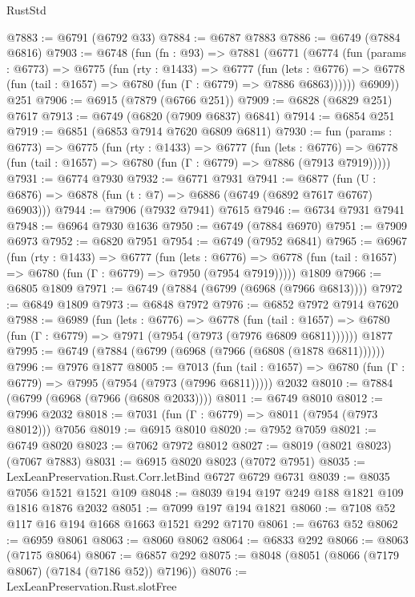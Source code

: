 \begin{lexlean}{RustStd}
\begin{coremodule}
@7883 := @6791 (@6792 @33)
@7884 := @6787 @7883
@7886 := @6749 (@7884 @6816)
@7903 := @6748
    (fun (fn : @93) =>
    @7881
      (@6771
        (@6774
          (fun (params : @6773) =>
          @6775
            (fun (rty : @1433) =>
            @6777
              (fun (lets : @6776) =>
              @6778 (fun (tail : @1657) => @6780 (fun (Γ : @6779) => @7886 @6863))))))
        @6909))
    @251
@7906 := @6915 (@7879 (@6766 @251))
@7909 := @6828 (@6829 @251) @7617
@7913 := @6749 (@6820 (@7909 @6837) @6841)
@7914 := @6854 @251
@7919 := @6851 (@6853 @7914 @7620 @6809 @6811)
@7930 := fun (params : @6773) =>
  @6775
    (fun (rty : @1433) =>
    @6777
      (fun (lets : @6776) =>
      @6778 (fun (tail : @1657) => @6780 (fun (Γ : @6779) => @7886 (@7913 @7919)))))
@7931 := @6774 @7930
@7932 := @6771 @7931
@7941 := @6877 (fun (U : @6876) => @6878 (fun (t : @7) => @6886 (@6749 (@6892 @7617 @6767) @6903)))
@7944 := @7906 (@7932 @7941) @7615
@7946 := @6734 @7931 @7941
@7948 := @6964 @7930 @1636
@7950 := @6749 (@7884 @6970)
@7951 := @7909 @6973
@7952 := @6820 @7951
@7954 := @6749 (@7952 @6841)
@7965 := @6967
    (fun (rty : @1433) =>
    @6777
      (fun (lets : @6776) =>
      @6778 (fun (tail : @1657) => @6780 (fun (Γ : @6779) => @7950 (@7954 @7919)))))
    @1809
@7966 := @6805 @1809
@7971 := @6749 (@7884 (@6799 (@6968 (@7966 @6813))))
@7972 := @6849 @1809
@7973 := @6848 @7972
@7976 := @6852 @7972 @7914 @7620
@7988 := @6989
    (fun (lets : @6776) =>
    @6778
      (fun (tail : @1657) => @6780 (fun (Γ : @6779) => @7971 (@7954 (@7973 (@7976 @6809 @6811))))))
    @1877
@7995 := @6749 (@7884 (@6799 (@6968 (@7966 (@6808 (@1878 @6811))))))
@7996 := @7976 @1877
@8005 := @7013
    (fun (tail : @1657) => @6780 (fun (Γ : @6779) => @7995 (@7954 (@7973 (@7996 @6811)))))
    @2032
@8010 := @7884 (@6799 (@6968 (@7966 (@6808 @2033))))
@8011 := @6749 @8010
@8012 := @7996 @2032
@8018 := @7031 (fun (Γ : @6779) => @8011 (@7954 (@7973 @8012))) @7056
@8019 := @6915 @8010
@8020 := @7952 @7059
@8021 := @6749 @8020
@8023 := @7062 @7972 @8012
@8027 := @8019 (@8021 @8023) (@7067 @7883)
@8031 := @6915 @8020 @8023 (@7072 @7951)
@8035 := LexLeanPreservation.Rust.Corr.letBind @6727 @6729 @6731
@8039 := @8035 @7056 @1521 @1521 @109
@8048 := @8039 @194 @197 @249 @188 @1821 @109 @1816 @1876 @2032
@8051 := @7099 @197 @194 @1821
@8060 := @7108 @52 @117 @16 @194 @1668 @1663 @1521 @292 @7170
@8061 := @6763 @52
@8062 := @6959 @8061
@8063 := @8060 @8062
@8064 := @6833 @292
@8066 := @8063 (@7175 @8064)
@8067 := @6857 @292
@8075 := @8048 (@8051 (@8066 (@7179 @8067) (@7184 (@7186 @52)) @7196))
@8076 := LexLeanPreservation.Rust.slotFree

\end{coremodule}
\end{lexlean}
